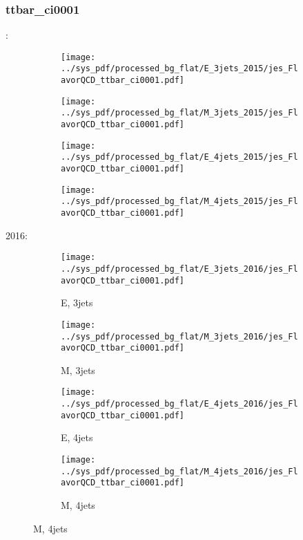 \documentclass{beamer}
\begin{document}
\begin{frame}
\frametitle{ttbar_ci0001}
\fontsize{5}{1}:
\begin{figure}
\centering
\begin{subfigure}[b]{0.24\textwidth}
\texttt{[image: ../sys\_pdf/processed\_bg\_flat/E\_3jets\_2015/jes\_FlavorQCD\_ttbar\_ci0001.pdf]}
\end{subfigure}
\begin{subfigure}[b]{0.24\textwidth}
\texttt{[image: ../sys\_pdf/processed\_bg\_flat/M\_3jets\_2015/jes\_FlavorQCD\_ttbar\_ci0001.pdf]}
\end{subfigure}
\begin{subfigure}[b]{0.24\textwidth}
\texttt{[image: ../sys\_pdf/processed\_bg\_flat/E\_4jets\_2015/jes\_FlavorQCD\_ttbar\_ci0001.pdf]}
\end{subfigure}
\begin{subfigure}[b]{0.24\textwidth}
\texttt{[image: ../sys\_pdf/processed\_bg\_flat/M\_4jets\_2015/jes\_FlavorQCD\_ttbar\_ci0001.pdf]}
\end{subfigure}
\end{figure}
2016:
\begin{figure}
\centering
\begin{subfigure}[b]{0.24\textwidth}
\texttt{[image: ../sys\_pdf/processed\_bg\_flat/E\_3jets\_2016/jes\_FlavorQCD\_ttbar\_ci0001.pdf]}
\captionsetup{font=tiny}
\caption{E, 3jets}
\end{subfigure}
\begin{subfigure}[b]{0.24\textwidth}
\texttt{[image: ../sys\_pdf/processed\_bg\_flat/M\_3jets\_2016/jes\_FlavorQCD\_ttbar\_ci0001.pdf]}
\captionsetup{font=tiny}
\caption{M, 3jets}
\end{subfigure}
\begin{subfigure}[b]{0.24\textwidth}
\texttt{[image: ../sys\_pdf/processed\_bg\_flat/E\_4jets\_2016/jes\_FlavorQCD\_ttbar\_ci0001.pdf]}
\captionsetup{font=tiny}
\caption{E, 4jets}
\end{subfigure}
\begin{subfigure}[b]{0.24\textwidth}
\texttt{[image: ../sys\_pdf/processed\_bg\_flat/M\_4jets\_2016/jes\_FlavorQCD\_ttbar\_ci0001.pdf]}
\captionsetup{font=tiny}
\caption{M, 4jets}
\end{subfigure}
\end{figure}
\end{frame}
\end{document}
